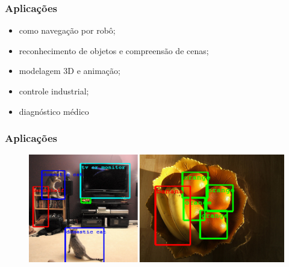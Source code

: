 \begin{frame}
  \frametitle{Aplicações}
\begin{itemize}
  \item como navegação por robô;
  \item reconhecimento de objetos e compreensão de cenas;
  \item modelagem 3D e animação;
  \item controle industrial;
  \item diagnóstico médico
\end{itemize}

\end{frame}

\begin{frame}
  \frametitle{Aplicações}
\begin{figure}[h!]
  \begin{center}
    \includegraphics[width=\textwidth]{images/domestic_cat_tv_orange.png}
  \end{center}
\end{figure}

\end{frame}



